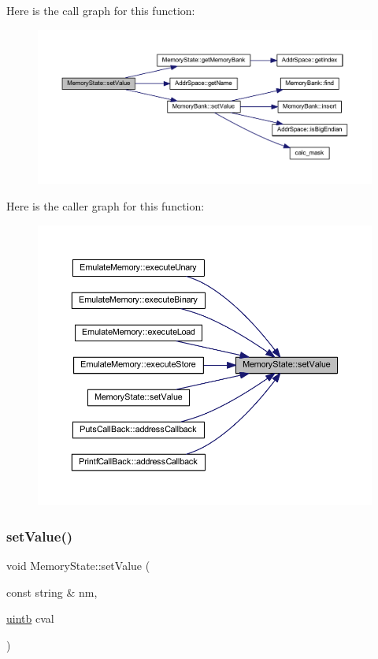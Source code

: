 Here is the call graph for this function\+:
\nopagebreak
\begin{figure}[H]
\begin{center}
\leavevmode
\includegraphics[width=350pt]{class_memory_state_af4abdf013cacfaa4cfbe223f3893a76a_cgraph}
\end{center}
\end{figure}
Here is the caller graph for this function\+:
\nopagebreak
\begin{figure}[H]
\begin{center}
\leavevmode
\includegraphics[width=350pt]{class_memory_state_af4abdf013cacfaa4cfbe223f3893a76a_icgraph}
\end{center}
\end{figure}
\mbox{\label{class_memory_state_aec6679949faa142792307fee30506512}} 
\subsubsection{\texorpdfstring{setValue()}{setValue()}\hspace{0.1cm}{\footnotesize\ttfamily [2/3]}}
{\footnotesize\ttfamily void Memory\+State\+::set\+Value (\begin{DoxyParamCaption}\item[{const string \&}]{nm,  }\item[{\mbox{\hyperlink{types_8h_a2db313c5d32a12b01d26ac9b3bca178f}{uintb}}}]{cval }\end{DoxyParamCaption})}



